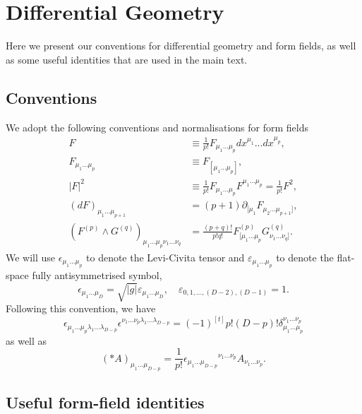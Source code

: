 \section{Differential Geometry}

Here we present our conventions for differential geometry and form fields, as well as some useful identities that are used in the main text.

\subsection*{Conventions}
We adopt the following conventions and normalisations for form fields
\begin{equation}
\begin{aligned}
F &\equiv \frac{1}{p!}F_{\mu_1...\mu_p} dx^{\mu_1}...dx^{\mu_p},\\
F_{\mu_1...\mu_p} &\equiv F_{[\mu_1...\mu_p]},\\
|F|^2 &\equiv \frac{1}{p!}F_{\mu_1...\mu_p} F^{\mu_1...\mu_p}=\frac{1}{p!}F^2,\\
(d F)_{\mu_1...\mu_{p+1}} &= (p+1)\partial_{[\mu_1} F_{\mu_2...\mu_{p+1}]},\\
(F^{(p)} \wedge G^{(q)})_{\mu_1...\mu_p \nu_1 ... \nu_q}
&=\frac{(p+q)!}{p!q!}F^{(p)}_{[\mu_1...\mu_p}  G^{(q)}_{\nu_1 ... \nu_q]}.
\end{aligned}
\end{equation}
We will use $\epsilon_{\mu_1 ... \mu_p}$ to denote the Levi-Civita tensor and $\varepsilon_{\mu_1 ... \mu_p}$ to denote the flat-space fully antisymmetrised symbol,
\begin{equation}
\epsilon_{\mu_1...\mu_D} = \sqrt{|g|}\varepsilon_{\mu_1...\mu_D},\quad
\varepsilon_{0,1,...,(D-2),(D-1)} = 1.
\end{equation}
Following this convention, we have
\begin{equation}
\epsilon_{\mu_1...\mu_p \lambda_1 ...\lambda_{D-p}}
\epsilon^{\nu_1...\nu_p \lambda_1 ...\lambda_{D-p}}
=(-1)^{[t]} p!(D-p)!\delta^{\nu_1...\nu_p}_{\mu_1...\mu_p}
\end{equation}
as well as
\begin{equation}
(*A)_{\mu_1...\mu_{D-p}} = \frac{1}{p!}
\epsilon_{\mu_1...\mu_{D-p}}{}^{\nu_1...\nu_p} A_{\nu_1...\nu_p}.
\end{equation}

\subsection*{Useful form-field identities}

